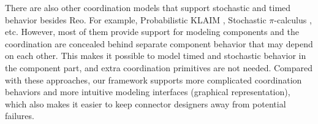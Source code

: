 

\vspace{0.2cm}

    There are also other coordination models that support stochastic and timed behavior besides Reo. For example, Probabilistic KLAIM \cite{Pierro2004}, Stochastic $\pi$-calculus \cite{Priami95}, etc. However, most of them provide support for modeling components and the coordination are concealed behind separate component behavior that may depend on each other. This makes it possible to model timed and stochastic behavior in the component part, and extra coordination primitives are not needed. Compared with these approaches, our framework supports more complicated coordination behaviors and more intuitive modeling interfaces (graphical representation), which also makes it easier to keep connector designers away from potential failures.

